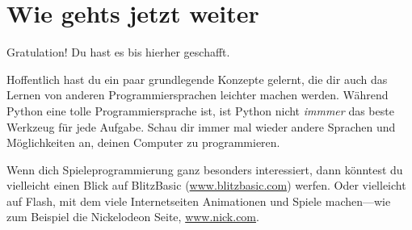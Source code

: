 

\chapter{Wie gehts jetzt weiter}

Gratulation! Du hast es bis hierher geschafft.
\par
\vspace{1em}
Hoffentlich hast du ein paar grundlegende Konzepte gelernt, die dir auch das Lernen von anderen Programmiersprachen leichter machen werden. Während Python eine tolle Programmiersprache ist, ist Python nicht \emph{immmer} das beste Werkzeug für jede Aufgabe. Schau dir immer mal wieder andere Sprachen und Möglichkeiten an, deinen Computer zu programmieren.

\vspace{1em}
Wenn dich Spieleprogrammierung ganz besonders interessiert, dann könntest du vielleicht einen Blick auf BlitzBasic (\href{http://www.blitzbasic.com}{www.blitzbasic.com}) werfen. Oder vielleicht auf Flash, mit dem viele Internetseiten Animationen und Spiele machen---wie zum Beispiel die Nickelodeon Seite, \href{http://www.nick.com}{www.nick.com}.

